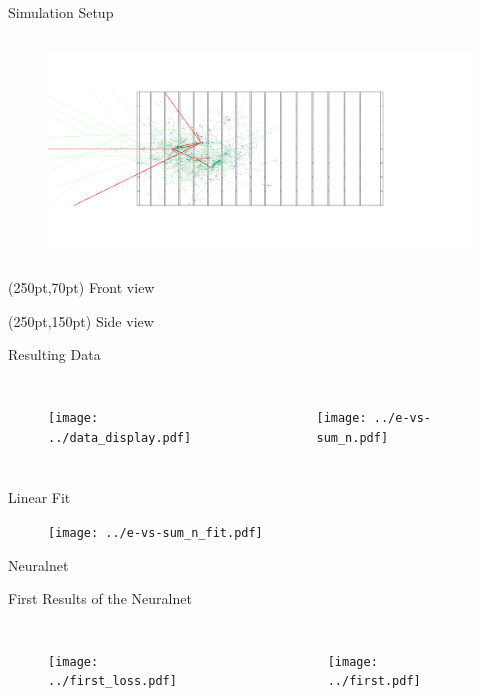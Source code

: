 \documentclass[10pt]{beamer}
\begin{document}
\begin{frame}{Simulation Setup}
\begin{columns}
\begin{figure}[htp]
      \includegraphics[width=1.1\textwidth]{side.png}
    \end{figure}
  \end{columns}
  \begin{textblock*}{100pt}(250pt,70pt)
    Front view
  \end{textblock*}
  \begin{textblock*}{100pt}(250pt,150pt)
    Side view
  \end{textblock*}
\end{frame}

\begin{frame}{Resulting Data}
  \begin{columns}
    \begin{figure}[htp]
      \texttt{[image: ../data\_display.pdf]}
    \end{figure}
    \begin{figure}[htp]
      \texttt{[image: ../e-vs-sum\_n.pdf]}
    \end{figure}
  \end{columns}
\end{frame}

\begin{frame}{Linear Fit}
    \begin{figure}[htp]
      \texttt{[image: ../e-vs-sum\_n\_fit.pdf]}
    \end{figure}  
\end{frame}

\begin{frame}{Neuralnet}

\end{frame}

\begin{frame}{First Results of the Neuralnet}
  \begin{columns}
    \begin{figure}[htp]
      \texttt{[image: ../first\_loss.pdf]}
    \end{figure}
    \begin{figure}[htp]
      \texttt{[image: ../first.pdf]}
    \end{figure}
  \end{columns}
\end{frame}
\end{document}
